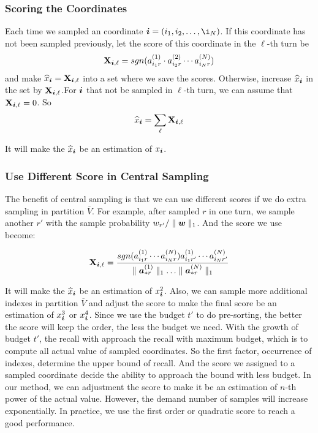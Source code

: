 \documentclass[letterpaper]{article}
\newcommand{\Sca}[3]{{#1}^{(#2)}_{i_#2#3}}%
\newcommand{\V}[1]{{\bm{{\MakeLowercase{#1}}}}}
\newcommand{\Vacol}[1]{\V{a}^{(#1)}_{*r}}
\newcommand{\M}[1]{{\bm{\mathbf{\MakeUppercase{#1}}}}}
\newcommand{\norm}[2]{\parallel#1\parallel_{#2}}
\begin{document}
\subsubsection{Scoring the Coordinates}

Each time we sampled an coordinate $\V{i} = (i_1,i_2,\ldots,\i_N) $. If this coordinate has not been sampled previously, let the score of this coordinate in the $\ell $-th turn be
\[
\M{X}_{\V{i},\ell}  = sgn(\Sca{a}{1}{r}\cdot\Sca{a}{2}{r}\cdots\Sca{a}{N}{r})
\]
and make $\widehat{x}_{\V{i}} = \M{X}_{\V{i},\ell}$ into a set where we save the scores. Otherwise, increase $\widehat{x}_{\V{i}}$ in the set by $\M{X}_{\V{i},\ell}$.For $\V{i}$ that not be sampled in $\ell$-th turn, we can assume that $\M{X}_{\V{i},\ell}=0$. So
\[
\widehat{x}_{\V{i}} = \sum_{\ell} \M{X}_{\V{i},\ell}
\]

It will make the $\widehat{x}_{\V{i}}$ be an estimation of $x_{\V{i}}$.

\subsubsection{Use Different Score in Central Sampling}
The benefit of central sampling is that we can use different scores if we do extra sampling in partition $\overline{V}$. For example, after sampled $r$ in one turn, we sample another $r'$ with the sample probability $w_{r'}/\norm{\V{w}}{1}$. And the score we use become:

\[
\M{X}_{\V{i},\ell}  = \frac{sgn(\Sca{a}{1}{r}\cdots\Sca{a}{N}{r})\Sca{a}{1}{r'}\cdots\Sca{a}{N}{r'}}{\norm{\Vacol{1}}{1}\ldots\norm{\Vacol{N}}{1}}
\]

It will make the $\widehat{x}_{\V{i}}$ be an estimation of $x_{\V{i}}^2$. Also, we can sample more additional indexes in partition $\overline{V}$ and adjust the score to make the final score be an estimation of $x_{\V{i}}^3$ or $x_{\V{i}}^4$. Since we use the budget $t'$ to do pre-sorting, the better the score will keep the order, the less the budget we need. With the growth of budget $t'$, the recall with approach the recall with maximum budget, which is to compute all actual value of sampled coordinates. So the first factor, occurrence of indexes, determine the upper bound of recall. And the score we assigned to a sampled coordinate decide the ability to approach the bound with less budget. In our method, we can adjustment the score to make it be an estimation of $n$-th power of the actual value. However, the demand number of samples will increase exponentially. In practice, we use the first order or quadratic score to reach a good performance.
\end{document}
